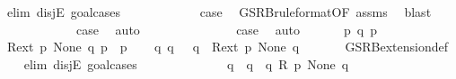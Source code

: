 \begin{isabellebody}
\ {\isacharparenleft}{\kern0pt}elim\ disjE{\isacharcomma}{\kern0pt}\ goal{\isacharunderscore}{\kern0pt}cases{\isacharparenright}{\kern0pt}\isanewline
\ \ \ \ \isamarkupfalse%
\ {}\isanewline
\ \ \ \ \isamarkupfalse%
\ {\isacharquery}{\kern0pt}case\ \isamarkupfalse%
\ GSRB{\isacharunderscore}{\kern0pt}ruleformat{\isacharparenleft}{\kern0pt}{}{\isacharparenright}{\kern0pt}{\isacharbrackleft}{\kern0pt}OF\ assms{\isacharbrackright}{\kern0pt}\ \isamarkupfalse%
\ blast\isanewline
\ \ \isamarkupfalse%
\isanewline
\ \ \ \ \isamarkupfalse%
\ {}\isanewline
\ \ \ \ \isamarkupfalse%
\ {\isacharquery}{\kern0pt}case\ \isamarkupfalse%
\ auto\isanewline
\ \ \isamarkupfalse%
\isanewline
\ \ \ \ \isamarkupfalse%
\ {}\isanewline
\ \ \ \ \isamarkupfalse%
\ {\isacharquery}{\kern0pt}case\ \isamarkupfalse%
\ auto\isanewline
\ \ \isamarkupfalse%
\isanewline
{}\isamarkupfalse%
\isanewline
\ \ \isamarkupfalse%
\ p\ q\ p{\isacharprime}{\kern0pt}\isanewline
\ \ \isamarkupfalse%
\ {\isacartoucheopen}{\isacharquery}{\kern0pt}R{\isacharunderscore}{\kern0pt}ext\ p\ None\ q{\isacartoucheclose}\ {\isacartoucheopen}p\ {\isasymlongmapsto}{\isasymtau}\ p{\isacharprime}{\kern0pt}{\isacartoucheclose}\isanewline
\ \ \isamarkupfalse%
\ {\isacartoucheopen}{\isasymexists}q{\isacharprime}{\kern0pt}{\isachardot}{\kern0pt}\ q\ {\isasymlongmapsto}{\isasymtau}\ \ q{\isacharprime}{\kern0pt}\ {\isasymand}\ {\isacharquery}{\kern0pt}R{\isacharunderscore}{\kern0pt}ext\ p{\isacharprime}{\kern0pt}\ None\ q{\isacharprime}{\kern0pt}{\isacartoucheclose}\ \isanewline
\ \ \ \ \isamarkupfalse%
\ GSRB{\isacharunderscore}{\kern0pt}extension{\isacharunderscore}{\kern0pt}def\isanewline
\ \ \isamarkupfalse%
\ {\isacharparenleft}{\kern0pt}elim\ disjE{\isacharcomma}{\kern0pt}\ goal{\isacharunderscore}{\kern0pt}cases{\isacharparenright}{\kern0pt}\isanewline
\ \ \ \ \isamarkupfalse%
\ {}\isanewline
\ \ \ \ \isamarkupfalse%
\ \isamarkupfalse%
\ q{\isacharprime}{\kern0pt}\ \ {\isacartoucheopen}q\ {\isasymlongmapsto}{\isasymtau}\ q{\isacharprime}{\kern0pt}{\isacartoucheclose}\ {\isacartoucheopen}R\ p{\isacharprime}{\kern0pt}\ None\ q{\isacharprime}{\kern0pt}{\isacartoucheclose}\isanewline

\end{isabellebody}
